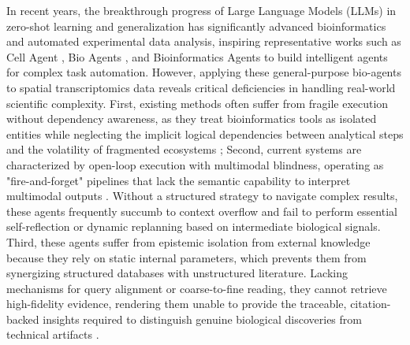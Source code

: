 \documentclass[a4,center,fleqn]{NAR}
\begin{document}
\enlargethispage{-65.1pt}
In recent years, the breakthrough progress of Large Language Models (LLMs) in zero-shot learning and generalization has significantly advanced bioinformatics and automated experimental data analysis, inspiring representative works such as Cell Agent \cite{xiao2024cellagent}, Bio Agents \cite{mehandru2025bioagents}, and Bioinformatics Agents \cite{xin2024bioinformatics} to build intelligent agents for complex task automation. However, applying these general-purpose bio-agents to spatial transcriptomics data reveals critical deficiencies in handling real-world scientific complexity. First, existing methods often suffer from fragile execution without dependency awareness, as they treat bioinformatics tools as isolated entities while neglecting the implicit logical dependencies between analytical steps and the volatility of fragmented ecosystems \cite{dries2021giotto,liu2025benchmarking}; Second, current systems are characterized by open-loop execution with multimodal blindness, operating as "fire-and-forget" pipelines that lack the semantic capability to interpret multimodal outputs \cite{wang2025large}. Without a structured strategy to navigate complex results, these agents frequently succumb to context overflow and fail to perform essential self-reflection or dynamic replanning based on intermediate biological signals. Third, these agents suffer from epistemic isolation from external knowledge because they rely on static internal parameters, which prevents them from synergizing structured databases with unstructured literature. Lacking mechanisms for query alignment or coarse-to-fine reading, they cannot retrieve high-fidelity evidence, rendering them unable to provide the traceable, citation-backed insights required to distinguish genuine biological discoveries from technical artifacts \cite{neha2025retrieval}.
\end{document}
